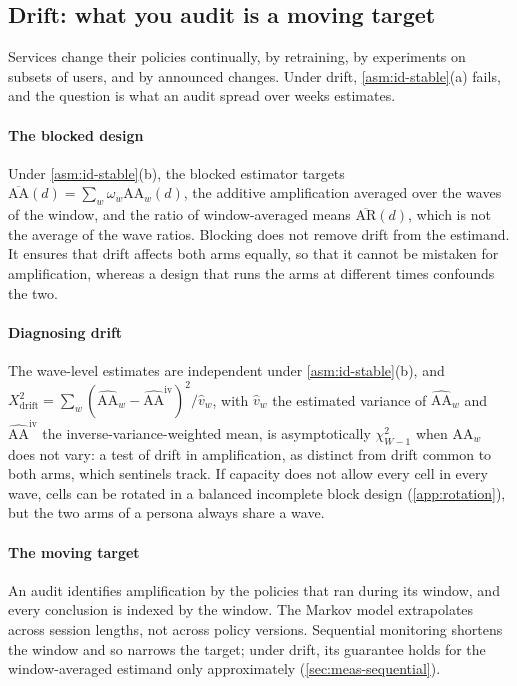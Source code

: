 \subsection{Drift: what you audit is a moving target}\label{sec:id-drift}

Services change their policies continually, by retraining, by experiments on subsets of users, and by announced changes. Under drift, \cref{asm:id-stable}(a) fails, and the question is what an audit spread over weeks estimates.

\paragraph{The blocked design}
Under \cref{asm:id-stable}(b), the blocked estimator targets $\overline{\mathrm{AA}}(d)=\sum_w\omega_w\mathrm{AA}_w(d)$, the additive amplification averaged over the waves of the window, and the ratio of window-averaged means $\overline{\mathrm{AR}}(d)$, which is not the average of the wave ratios. Blocking does not remove drift from the estimand. It ensures that drift affects both arms equally, so that it cannot be mistaken for amplification, whereas a design that runs the arms at different times confounds the two.

\paragraph{Diagnosing drift}
The wave-level estimates are independent under \cref{asm:id-stable}(b), and $X^2_{\mathrm{drift}}=\sum_w(\widehat{\mathrm{AA}}_w-\widehat{\mathrm{AA}}^{\mathrm{iv}})^2/\widehat v_w$, with $\widehat v_w$ the estimated variance of $\widehat{\mathrm{AA}}_w$ and $\widehat{\mathrm{AA}}^{\mathrm{iv}}$ the inverse-variance-weighted mean, is asymptotically $\chi^2_{W-1}$ when $\mathrm{AA}_w$ does not vary: a test of drift in amplification, as distinct from drift common to both arms, which sentinels track. If capacity does not allow every cell in every wave, cells can be rotated in a balanced incomplete block design (\cref{app:rotation}), but the two arms of a persona always share a wave.

\paragraph{The moving target}
An audit identifies amplification by the policies that ran during its window, and every conclusion is indexed by the window. The Markov model extrapolates across session lengths, not across policy versions. Sequential monitoring shortens the window and so narrows the target; under drift, its guarantee holds for the window-averaged estimand only approximately (\cref{sec:meas-sequential}).


